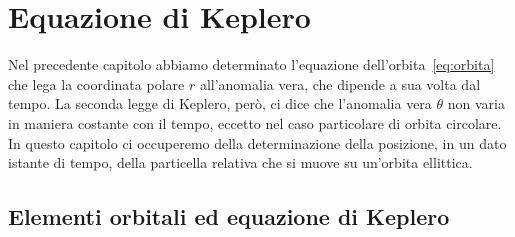 \chapter{Equazione di Keplero}
\label{chap:equazione-keplero}

Nel precedente capitolo abbiamo determinato l'equazione
dell'orbita~\eqref{eq:orbita} che lega la coordinata polare $r$ all'anomalia
vera, che dipende a sua volta dal tempo. La seconda legge di Keplero, però, ci
dice che l'anomalia vera $\theta$ non varia in maniera costante con il tempo,
eccetto nel caso particolare di orbita circolare. In questo capitolo ci
occuperemo della determinazione della posizione, in un dato istante di tempo,
della particella relativa che si muove su un'orbita ellittica.

\section{Elementi orbitali ed equazione di Keplero}
\label{sec:elementi-orbitali}

